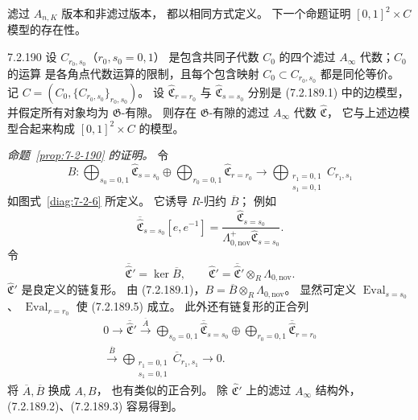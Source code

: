 滤过 $A_{n,K}$ 版本和非滤过版本，
都以相同方式定义。
下一个命题证明 $[0,1]^2\times C$ 模型的存在性。

\begin{proposition}{7.2.190}\label{prop:7-2-190}
设 $C_{r_0,s_0}$（$r_0,s_0=0,1$）
是包含共同子代数 $C_0$ 的四个滤过
$A_\infty$ 代数；$C_0$ 的运算
是各角点代数运算的限制，且每个包含映射
$C_0\subset C_{r_0,s_0}$ 都是同伦等价。
记 $C=(C_0,\{C_{r_0,s_0}\}_{r_0,s_0})$。
设 $\widehat{\mathfrak C}_{r=r_0}$
与 $\widehat{\mathfrak C}_{s=s_0}$
分别是 (7.2.189.1) 中的边模型，
并假定所有对象均为 $\mathfrak G$-有隙。
则存在 $\mathfrak G$-有隙的滤过
$A_\infty$ 代数 $\widehat{\mathfrak C}$，
它与上述边模型合起来构成
$[0,1]^2\times C$ 的模型。
\end{proposition}

\par\noindent\textit{命题~\ref{prop:7-2-190} 的证明。}
令
\[
B\colon
\bigoplus_{s_0=0,1}\widehat{\mathfrak C}_{s=s_0}
\oplus
\bigoplus_{r_0=0,1}\widehat{\mathfrak C}_{r=r_0}
\longrightarrow
\bigoplus_{\substack{r_1=0,1\\s_1=0,1}}C_{r_1,s_1}
\]
如图式~\ref{diag:7-2-6} 所定义。
它诱导 $R$-归约 $\overline B$；
例如
\[
\overline{\widehat{\mathfrak C}}_{s=s_0}
[e,e^{-1}]
=
\frac{\widehat{\mathfrak C}_{s=s_0}}
{\Lambda_{0,\mathrm{nov}}^+
\widehat{\mathfrak C}_{s=s_0}}.
\]
令
\begin{equation}
\overline{\widehat{\mathfrak C}}'
=\ker\overline B,
\qquad
\widehat{\mathfrak C}'
=\overline{\widehat{\mathfrak C}}'
\otimes_R\Lambda_{0,\mathrm{nov}}.
\tag{7.2.191}\label{eq:7-2-191}
\end{equation}
$\widehat{\mathfrak C}'$ 是良定义的链复形。
由 (7.2.189.1)，$B=\overline B
\otimes_R\Lambda_{0,\mathrm{nov}}$。
显然可定义 $\operatorname{Eval}_{s=s_0}$、
$\operatorname{Eval}_{r=r_0}$
使 (7.2.189.5) 成立。
此外还有链复形的正合列
\begin{equation}
\begin{gathered}
0\longrightarrow
\overline{\widehat{\mathfrak C}}'
\xrightarrow{\overline A}
\bigoplus_{s_0=0,1}
\overline{\widehat{\mathfrak C}}_{s=s_0}
\oplus
\bigoplus_{r_0=0,1}
\overline{\widehat{\mathfrak C}}_{r=r_0}
\\
\xrightarrow{\overline B}
\bigoplus_{\substack{r_1=0,1\\s_1=0,1}}
\overline C_{r_1,s_1}
\longrightarrow0.
\end{gathered}
\tag{7.2.192}\label{eq:7-2-192}
\end{equation}
将 $\overline A,\overline B$ 换成 $A,B$，
也有类似的正合列。
除 $\widehat{\mathfrak C}'$ 上的滤过
$A_\infty$ 结构外，
(7.2.189.2)、(7.2.189.3) 容易得到。

